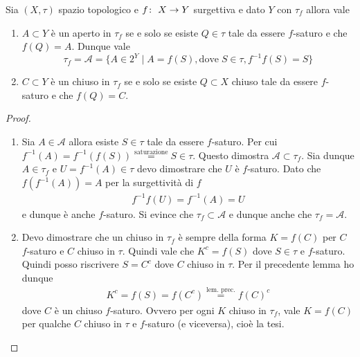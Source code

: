 \begin{theorem}
	Sia $(X, \tau)$ spazio topologico e $f \colon\ X \rightarrow Y$ surgettiva e dato $Y$ con $\tau_f$ allora vale 
	\begin{enumerate}
		\item $A \subset Y$ è un aperto in $\tau_f$ se e solo se esiste $Q \in \tau$ tale da essere $f$-saturo e che $f(Q) = A$. Dunque vale 
		\begin{equation}
		\tau_f = \mathcal{A} = \{ A \in 2^Y \;|\; A = f(S), \text{dove} \; S \in \tau, f^{-1}f(S) = S\}
		\end{equation}
		\item $C \subset Y$ è un chiuso in $\tau_f$ se e solo se esiste $Q \subset X$ chiuso tale da essere $f$-saturo e che $f(Q) = C$.
	\end{enumerate}
\end{theorem}
\begin{proof}
	\begin{enumerate}
			\item Sia $A \in \mathcal{A}$ allora esiste $S \in \tau$ tale da essere $f$-saturo. Per cui $f^{-1}(A) = f^{-1}(f(S)) \overset{\text{saturazione}}{=} S \in \tau$. Questo dimostra $\mathcal{A} \subset \tau_f$. Sia dunque $A \in \tau_f$ e $U = f^{-1}(A) \in \tau$ devo dimostrare che $U$ è $f$-saturo. 
			Dato che $f(f^{-1}(A)) = A$ per la surgettività di $f$   
			\begin{equation}
			\begin{aligned}
				f^{-1}f(U) = f^{-1}(A) = U
			\end{aligned}
			\end{equation} 
			e dunque è anche $f$-saturo. Si evince che $\tau_f \subset \mathcal{A}$ e dunque anche che $\tau_f = \mathcal{A}$.
		\item Devo dimostrare che un chiuso in $\tau_f$ è sempre della forma $K = f(C)$ per $C$ $f$-saturo e $C$ chiuso in $\tau$. Quindi vale che $K^c = f(S)$ dove $S \in \tau$ e $f$-saturo. Quindi posso riscrivere $S = C^c$ dove $C$ chiuso in $\tau$. Per il precedente lemma ho dunque
		\begin{equation}
		\begin{aligned}
			K^c = f(S) = f(C^c) \overset{\text{lem. prec.}}{=} f(C)^c
		\end{aligned}
		\end{equation}
		dove $C$ è un chiuso $f$-saturo. Ovvero per ogni $K$ chiuso in $\tau_f$, vale $K = f(C)$ per qualche $C$ chiuso in $\tau$ e $f$-saturo (e viceversa), cioè la tesi.
	\end{enumerate}
\end{proof}

